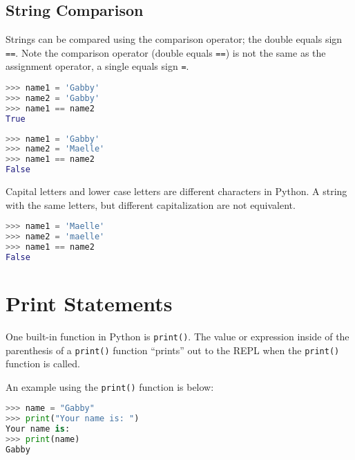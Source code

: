 \documentclass{book}
\newcommand{\passthrough}[1]{#1}
\begin{document}
    
        \hypertarget{string-comparison}{%
\subsection{String Comparison}\label{string-comparison}}
    




    
        Strings can be compared using the comparison operator; the double equals
sign \passthrough{\lstinline!==!}. Note the comparison operator (double
equals \passthrough{\lstinline!==!}) is not the same as the assignment
operator, a single equals sign \passthrough{\lstinline!=!}.

\begin{lstlisting}[language=Python]
>>> name1 = 'Gabby'
>>> name2 = 'Gabby'
>>> name1 == name2
True
\end{lstlisting}

\begin{lstlisting}[language=Python]
>>> name1 = 'Gabby'
>>> name2 = 'Maelle'
>>> name1 == name2
False
\end{lstlisting}

Capital letters and lower case letters are different characters in
Python. A string with the same letters, but different capitalization are
not equivalent.

\begin{lstlisting}[language=Python]
>>> name1 = 'Maelle'
>>> name2 = 'maelle'
>>> name1 == name2
False
\end{lstlisting}
    




    
        \hypertarget{print-statements}{%
\section{Print Statements}\label{print-statements}}
    




    
        One built-in function in Python is \passthrough{\lstinline!print()!}.
The value or expression inside of the parenthesis of a
\passthrough{\lstinline!print()!} function ``prints'' out to the REPL
when the \passthrough{\lstinline!print()!} function is called.

An example using the \passthrough{\lstinline!print()!} function is
below:

\begin{lstlisting}[language=Python]
>>> name = "Gabby"
>>> print("Your name is: ")
Your name is: 
>>> print(name)
Gabby
\end{lstlisting}
\end{document}
